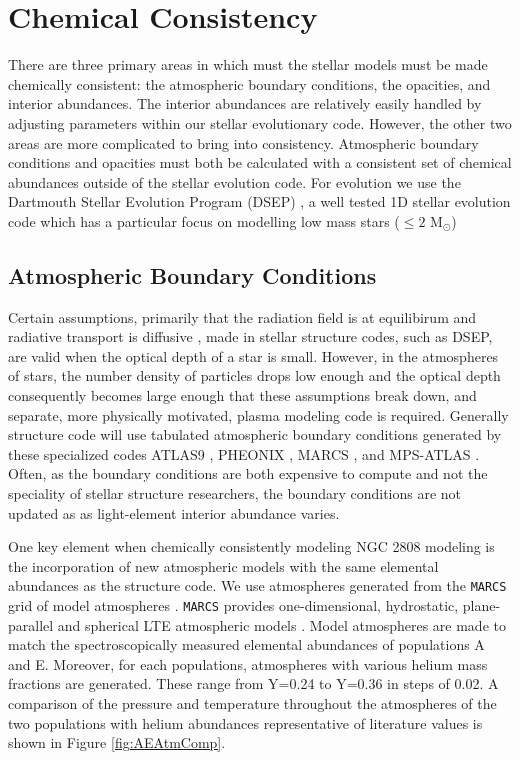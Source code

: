 \section{Chemical Consistency}\label{sec:const}
There are three primary areas in which must the stellar models must be made chemically
consistent: the atmospheric boundary conditions, the opacities, and interior
abundances. The interior abundances are relatively easily handled by adjusting
parameters within our stellar evolutionary code. However, the other two areas are
more complicated to bring into consistency. Atmospheric boundary conditions and
opacities must both be calculated with a consistent set of chemical abundances
outside of the stellar evolution code. For evolution we use the Dartmouth Stellar Evolution Program (DSEP) \citep{Dotter2008}, a well tested 1D stellar evolution code which has a particular focus on modelling low mass stars ($\le 2$ M$_{\odot}$)

\subsection{Atmospheric Boundary Conditions}\label{sec:atm}
Certain assumptions, primarily that the radiation field is at equilibirum and radiative transport is diffusive \citep{Salaris2005}, made in stellar structure
codes, such as DSEP, are valid when the optical depth of a star is small.
However, in the atmospheres of stars, the number density of particles drops low
enough and the optical depth consequently becomes large enough that these
assumptions break down, and separate, more physically motivated, plasma modeling code is required.
Generally structure code will use tabulated atmospheric boundary conditions
generated by these specialized codes ATLAS9 \citep{Kurucz1993}, PHEONIX \citep{Husser2013}, MARCS \citep{Gustafsson2008}, and MPS-ATLAS \citep{Kostogryz2023}. Often, as the boundary conditions are both expensive to compute
and not the speciality of stellar structure researchers, the boundary
conditions are not updated as as light-element interior abundance varies. 

One key element when chemically consistently modeling NGC 2808 modeling is the
incorporation of new atmospheric models with the same elemental abundances as
the structure code. We use atmospheres generated from the \texttt{MARCS} grid of
model atmospheres \citep{Plez2008}. \texttt{MARCS} provides one-dimensional,
hydrostatic, plane-parallel and spherical LTE atmospheric models
\citep{Gustafsson2008}. Model atmospheres are made to match the
spectroscopically measured elemental abundances of populations A and E.
Moreover, for each populations, atmospheres with  various helium mass fractions
are generated. These range from Y=0.24 to Y=0.36 in steps of 0.02. A comparison
of the pressure and temperature throughout the atmospheres of the two
populations with helium abundances representative of literature values is shown
in Figure \ref{fig:AEAtmComp}.

